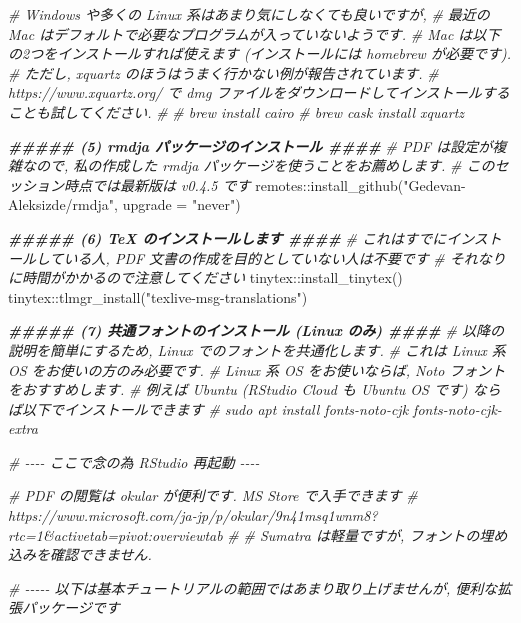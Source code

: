 \documentclass[
]{ltjsarticle}
\newenvironment{Shaded}{\begin{snugshade}}{\end{snugshade}}
\newcommand{\AttributeTok}[1]{\textcolor[rgb]{0.77,0.63,0.00}{#1}}
\newcommand{\CommentTok}[1]{\textcolor[rgb]{0.56,0.35,0.01}{\textit{#1}}}
\newcommand{\DocumentationTok}[1]{\textcolor[rgb]{0.56,0.35,0.01}{\textbf{\textit{#1}}}}
\newcommand{\FunctionTok}[1]{\textcolor[rgb]{0.00,0.00,0.00}{#1}}
\newcommand{\NormalTok}[1]{#1}
\newcommand{\SpecialCharTok}[1]{\textcolor[rgb]{0.00,0.00,0.00}{#1}}
\newcommand{\StringTok}[1]{\textcolor[rgb]{0.31,0.60,0.02}{#1}}
\begin{document}
\begin{Shaded}
\begin{Highlighting}[numbers=left,,]
\CommentTok{\# Windows や多くの Linux 系はあまり気にしなくても良いですが,}
\CommentTok{\# 最近の Mac はデフォルトで必要なプログラムが入っていないようです.}
\CommentTok{\# Mac は以下の2つをインストールすれば使えます (インストールには homebrew が必要です).}
\CommentTok{\# ただし, xquartz のほうはうまく行かない例が報告されています.}
\CommentTok{\# https://www.xquartz.org/ で dmg ファイルをダウンロードしてインストールすることも試してください.}
\CommentTok{\#}
\CommentTok{\# brew install cairo}
\CommentTok{\# brew cask install xquartz}

\DocumentationTok{\#\#\#\#\# (5) rmdja パッケージのインストール \#\#\#\#}
\CommentTok{\# PDF は設定が複雑なので, 私の作成した rmdja パッケージを使うことをお薦めします.}
\CommentTok{\# このセッション時点では最新版は v0.4.5 です}
\NormalTok{remotes}\SpecialCharTok{::}\FunctionTok{install\_github}\NormalTok{(}\StringTok{"Gedevan{-}Aleksizde/rmdja"}\NormalTok{, }\AttributeTok{upgrade =} \StringTok{"never"}\NormalTok{)}

\DocumentationTok{\#\#\#\#\# (6) TeX のインストールします \#\#\#\#}
\CommentTok{\# これはすでにインストールしている人, PDF 文書の作成を目的としていない人は不要です}
\CommentTok{\# それなりに時間がかかるので注意してください}
\NormalTok{tinytex}\SpecialCharTok{::}\FunctionTok{install\_tinytex}\NormalTok{()}
\NormalTok{tinytex}\SpecialCharTok{::}\FunctionTok{tlmgr\_install}\NormalTok{(}\StringTok{"texlive{-}msg{-}translations"}\NormalTok{)}

\DocumentationTok{\#\#\#\#\# (7) 共通フォントのインストール (Linux のみ) \#\#\#\#}
\CommentTok{\# 以降の説明を簡単にするため, Linux でのフォントを共通化します.}
\CommentTok{\# これは Linux 系 OS をお使いの方のみ必要です.}
\CommentTok{\# Linux 系 OS をお使いならば, Noto フォントをおすすめします.}
\CommentTok{\# 例えば Ubuntu (RStudio Cloud も Ubuntu OS です) ならば以下でインストールできます}
\CommentTok{\# sudo apt install fonts{-}noto{-}cjk fonts{-}noto{-}cjk{-}extra}


\CommentTok{\# {-}{-}{-}{-} ここで念の為 RStudio 再起動 {-}{-}{-}{-}}

\CommentTok{\# PDF の閲覧は okular が便利です. MS Store で入手できます}
\CommentTok{\# https://www.microsoft.com/ja{-}jp/p/okular/9n41msq1wnm8?rtc=1\&activetab=pivot:overviewtab}
\CommentTok{\#}
\CommentTok{\# Sumatra は軽量ですが, フォントの埋め込みを確認できません.}


\CommentTok{\# {-}{-}{-}{-}{-} 以下は基本チュートリアルの範囲ではあまり取り上げませんが, 便利な拡張パッケージです}


\end{Highlighting}
\end{Shaded}
\end{document}
